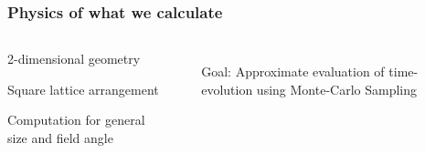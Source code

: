 \begin{frame}
    \frametitle{Physics of what we calculate}

    \begin{columns}
            \begin{wideitemize}
                \item 2-dimensional geometry
                \item Square lattice arrangement
                \item Computation for general size and field angle
            \end{wideitemize}
            
            \vspace{0.5cm}
            \pause
            \begin{itemize}
                \item[Goal:]
                Approximate evaluation of time-evolution using Monte-Carlo Sampling
            \end{itemize}

        \onslide
            
    \end{columns}

    \onslide %
\end{frame}

